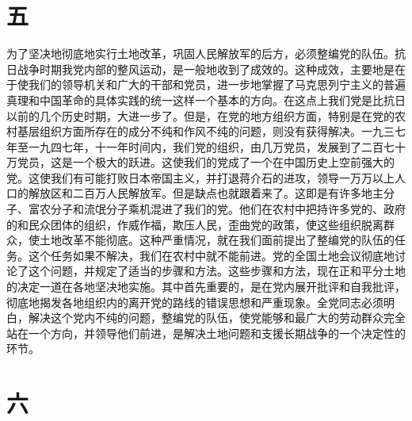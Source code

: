 \section*{五}

为了坚决地彻底地实行土地改革，巩固人民解放军的后方，必须整编党的队伍。抗日战争时期我党内部的整风运动，是一般地收到了成效的。这种成效，主要地是在于使我们的领导机关和广大的干部和党员，进一步地掌握了马克思列宁主义的普遍真理和中国革命的具体实践的统一这样一个基本的方向。在这点上我们党是比抗日以前的几个历史时期，大进一步了。但是，在党的地方组织方面，特别是在党的农村基层组织方面所存在的成分不纯和作风不纯的问题，则没有获得解决。一九三七年至一九四七年，十一年时间内，我们党的组织，由几万党员，发展到了二百七十万党员，这是一个极大的跃进。这使我们的党成了一个在中国历史上空前强大的党。这使我们有可能打败日本帝国主义，并打退蒋介石的进攻，领导一万万以上人口的解放区和二百万人民解放军。但是缺点也就跟着来了。这即是有许多地主分子、富农分子和流氓分子乘机混进了我们的党。他们在农村中把持许多党的、政府的和民众团体的组织，作威作福，欺压人民，歪曲党的政策，使这些组织脱离群众，使土地改革不能彻底。这种严重情况，就在我们面前提出了整编党的队伍的任务。这个任务如果不解决，我们在农村中就不能前进。党的全国土地会议彻底地讨论了这个问题，并规定了适当的步骤和方法。这些步骤和方法，现在正和平分土地的决定一道在各地坚决地实施。其中首先重要的，是在党内展开批评和自我批评，彻底地揭发各地组织内的离开党的路线的错误思想和严重现象。全党同志必须明白，解决这个党内不纯的问题，整编党的队伍，使党能够和最广大的劳动群众完全站在一个方向，并领导他们前进，是解决土地问题和支援长期战争的一个决定性的环节。

\section*{六}

